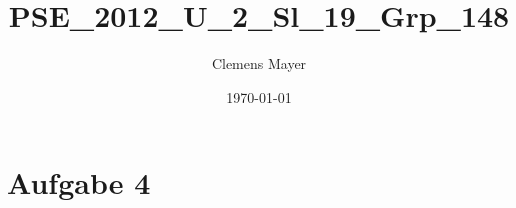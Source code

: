 \documentclass{scrartcl}
\title{PSE_2012_U_2_Sl_19_Grp_148}
\author{Clemens Mayer}
\date{\today}
\begin{document}
%

\section*{Aufgabe 4}

\end{document}
